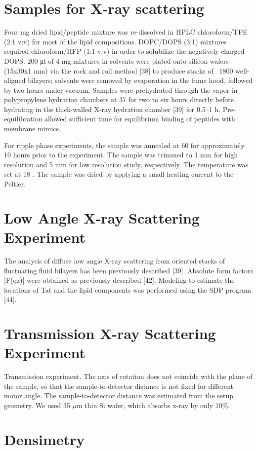 \section{Samples for X-ray scattering}
Four mg dried lipid/peptide mixture was re-dissolved in HPLC chloroform/TFE 
(2:1 v:v)
for most of the lipid compositions. DOPC/DOPS (3:1) mixtures required
chloroform/HFP (1:1 v:v) in order to solubilize the negatively charged DOPS. 
200 μl of 4 mg
mixtures in solvents were plated onto silicon wafers (15x30x1 mm) via the rock 
and roll method
[38] to produce stacks of ~1800 well-aligned bilayers; solvents were removed by 
evaporation in
the fume hood, followed by two hours under vacuum. Samples were prehydrated 
through the
vapor in polypropylene hydration chambers at 37 \degC for two to six hours 
directly before hydrating in the
thick-walled X-ray hydration chamber [39] for 0.5–1 h. Pre-equilibration 
allowed 
sufficient time
for equilibrium binding of peptides with membrane mimics.

For ripple phase experiments, the sample was annealed at 60 \degC for approximately
10 hours prior to the experiment. The sample was trimmed to 1 mm for high
resolution and 5 mm for low resolution study, respectively. The temperature
was set at 18 \degC. The sample was dried by applying a small heating 
current to the Peltier.




\section{Low Angle X-ray Scattering Experiment}
The analysis of diffuse low angle X-ray scattering from oriented stacks of 
fluctuating fluid bilayers has been previously described [39]. Absolute form 
factors |F(qz)| were obtained as previously described [42]. Modeling to 
estimate the locations of Tat and the lipid components
was performed using the SDP program [44].

\section{Transmission X-ray Scattering Experiment}
Transmission experiment. The axis of rotation does not coincide with the
plane of the sample, so that the sample-to-detector distance is not fixed
for different motor angle. The sample-to-detector distance was estimated
from the setup geometry. We used 35 $\mu$m thin Si wafer, which absorbs
x-ray by only 10\%. 

\section{Densimetry}
